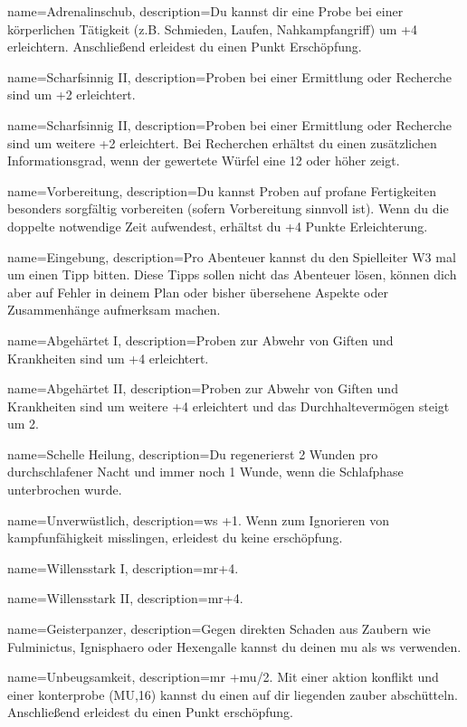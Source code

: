 {
    name={Adrenalinschub},
    description={Du kannst dir eine Probe bei einer körperlichen Tätigkeit (z.B. Schmieden, Laufen, Nahkampfangriff) um +4 erleichtern. Anschließend erleidest du einen Punkt Erschöpfung.}}
        
{
    name={Scharfsinnig II},
    description={Proben bei einer Ermittlung oder Recherche sind um +2 erleichtert.}}

{
    name={Scharfsinnig II},
    description={Proben bei einer Ermittlung oder Recherche sind um weitere +2 erleichtert. Bei Recherchen erhältst du einen zusätzlichen Informationsgrad, wenn der gewertete Würfel eine 12 oder höher zeigt.}}

{
    name={Vorbereitung},
    description={Du kannst Proben auf profane Fertigkeiten besonders sorgfältig vorbereiten (sofern Vorbereitung sinnvoll ist). Wenn du die doppelte notwendige Zeit aufwendest, erhältst du +4 Punkte Erleichterung.}}

{
    name={Eingebung},
    description={Pro Abenteuer kannst du den Spielleiter W3 mal um einen Tipp bitten. Diese Tipps sollen nicht das Abenteuer lösen, können dich aber auf Fehler in deinem Plan oder bisher übersehene Aspekte oder Zusammenhänge aufmerksam machen.}}

{
    name={Abgehärtet I},
    description={Proben zur Abwehr von Giften und Krankheiten sind um +4 erleichtert.}}

{
    name={Abgehärtet II},
    description={Proben zur Abwehr von Giften und Krankheiten sind um weitere +4 erleichtert und das Durchhaltevermögen steigt um 2.}}

{
    name={Schelle Heilung},
    description={Du regenerierst 2 Wunden pro durchschlafener Nacht und immer noch 1 Wunde, wenn die Schlafphase unterbrochen wurde.}}
        
{
    name={Unverwüstlich},
    description={\gls{ws} +1. Wenn  zum Ignorieren von \gls{kampfunfähigkeit} misslingen, erleidest du keine \gls{erschöpfung}.}}

{
    name={Willensstark I},
    description={\gls{mr}+4.}}

{
    name={Willensstark II},
    description={\gls{mr}+4.}}

{
    name={Geisterpanzer},
    description={Gegen direkten Schaden aus Zaubern wie Fulminictus, Ignisphaero oder Hexengalle kannst du deinen \gls{mu} als \gls{ws} verwenden.}}

{
    name={Unbeugsamkeit},
    description={\gls{mr} +\gls{mu}/2. Mit einer \gls{aktion} \gls{konflikt} und einer \gls{konterprobe} (MU,16) kannst du einen auf dir liegenden \gls{zauber} abschütteln. Anschließend erleidest du einen Punkt \gls{erschöpfung}.}}